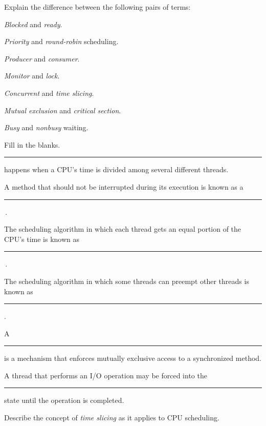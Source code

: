 
\begin{EXRtwo}
\item  Explain the difference between the following
pairs of terms:

\begin{EXRtwoLL}
\begin{multicols}{2}
\item  {\it Blocked} and {\it ready}.
\item  {\it Priority} and {\it round-robin} scheduling.
\item  {\it Producer} and {\it consumer}.
\item  {\it Monitor} and {\it lock}.
\item  {\it Concurrent} and {\it time slicing}.
\item  {\it Mutual exclusion} and {\it critical section}.
\item  {\it Busy} and {\it nonbusy} waiting.
\end{multicols}
\end{EXRtwoLL}


\item  Fill in the blanks.
\begin{EXRtwoLL}\baselineskip=12pt
\item  \rule{40pt}{0.5pt} happens when a CPU's time is divided among several
different threads.
\item  A method that should not be interrupted during its
execution is known as a  \rule{40pt}{0.5pt}\,.
\item  The scheduling algorithm in which each thread gets
an equal portion of the CPU's time is known as  \rule{40pt}{0.5pt}\,.
\item  The scheduling algorithm in which some threads can
preempt other threads is known as \rule{40pt}{0.5pt}.
\item  A \rule{40pt}{0.5pt} is a mechanism that enforces mutually exclusive
access to a synchronized method.
\item  A thread that performs an I/O operation may be forced
into the \rule{40pt}{0.5pt}  state until the operation is completed.
\end{EXRtwoLL}\baselineskip=11pt

\item  Describe the concept of {\it time slicing} as
it applies to CPU \mbox{scheduling.}


\end{EXRtwo}
